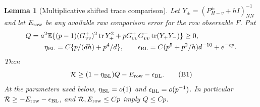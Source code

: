 \documentclass[10pt]{article}
\numberwithin{equation}{section}
\newtheorem{lemma}{Lemma}[section]
\newcommand{\1}{\mathbf1}
\begin{document}
\begin{lemma}[Multiplicative shifted trace comparison]\label{cu:shifted-star}
Let $Y_\pm=(P^\pm_{H-v}+hI)^{-1}_{NN}$ and let $E_{\rm row}$
be any available raw comparison error for the row observable $F$.
Put
\[
 \begin{split}
 Q=a^2\mathbb E\{&(p-1)(G^+_{vv})^2\operatorname{tr}Y_+^2
       +pG^+_{vv}G^-_{vv}\operatorname{tr}(Y_+Y_-)\}\ge0,\\
 \eta_{\rm BL}&=C\{p/(dh)+p^4/d\},\qquad
 \epsilon_{\rm BL}=C(p^5+p^2/h)d^{-10}+e^{-cp}.
 \end{split}
\]
Then
\[
 \mathcal R\ge(1-\eta_{\rm BL})Q-E_{\rm row}-\epsilon_{\rm BL}.
 \tag{B1}\label{eq:BLstar}
\]
At the parameters used below, $\eta_{\rm BL}=o(1)$ and
$\epsilon_{\rm BL}=o(p^{-1})$. In particular
$\mathcal R\ge-E_{\rm row}-\epsilon_{\rm BL}$, and
$\mathcal R,E_{\rm row}\le Cp$ imply $Q\le Cp$.
\end{lemma}
\end{document}
